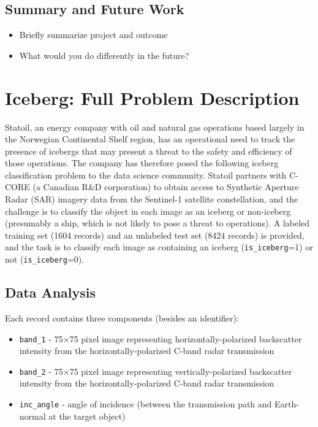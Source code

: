 \documentclass[fleqn,10pt]{SelfArx} %
\begin{document}
\subsection{Summary and Future Work}
\begin{itemize}[noitemsep]
\item Briefly summarize project and outcome
\item What would you do differently in the future?
\end{itemize}

\lipsum[10] %
\section{Iceberg: Full Problem Description}

Statoil, an energy company with oil and natural gas operations based largely in the Norwegian Continental Shelf region, has an operational need to track the presence of icebergs that may present a threat to the safety and efficiency of those operations. \cite{statoil} The company has therefore posed the following iceberg classification problem to the data science community.  Statoil partners with C-CORE (a Canadian R\&D corporation) to obtain access to Synthetic Aperture Radar (SAR) imagery data from the Sentinel-1 satellite constellation, and the challenge is to classify the object in each image as an iceberg or non-iceberg (presumably a ship, which is not likely to pose a threat to operations). A labeled training set (1604 records) and an unlabeled test set (8424 records) is provided, and the task is to classify each image as containing an iceberg (\texttt{is\_iceberg}=1) or not (\texttt{is\_iceberg}=0). \cite{kaggle}

\subsection{Data Analysis}
Each record contains three components (besides an identifier):

\begin{itemize}
	\item \texttt{band\_1} - 75$\times$75 pixel image representing horizontally-polarized backscatter intensity from the horizontally-polarized C-band radar transmission
	\item \texttt{band\_2} - 75$\times$75 pixel image representing vertically-polarized backscatter intensity from the horizontally-polarized C-band radar transmission
	\item \texttt{inc\_angle} - angle of incidence (between the transmission path and Earth-normal at the target object)
\end{itemize}
\end{document}
